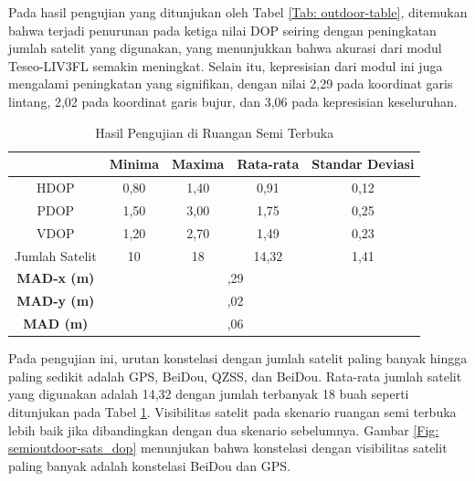 Pada hasil pengujian yang ditunjukan oleh Tabel \ref{Tab: outdoor-table}, ditemukan bahwa terjadi penurunan pada ketiga nilai DOP seiring dengan peningkatan jumlah satelit yang digunakan, yang menunjukkan bahwa akurasi dari modul Teseo-LIV3FL semakin meningkat. Selain itu, kepresisian dari modul ini juga mengalami peningkatan yang signifikan, dengan nilai 2,29 pada koordinat garis lintang, 2,02 pada koordinat garis bujur, dan 3,06 pada kepresisian keseluruhan.

\begin{table}[H]
	\caption{Hasil Pengujian di Ruangan Semi Terbuka}
	\vspace{0.5em}
	\centering
	\begin{tabular}{ccccc}
		\hline
		& \textbf{Minima} & \textbf{Maxima} & \textbf{Rata-rata} & \textbf{Standar Deviasi}\\
		\hline 
		HDOP & 0,80 & 1,40 & 0,91 & 0,12\\
		PDOP & 1,50	& 3,00 & 1,75 & 0,25\\
		VDOP & 1,20	& 2,70 & 1,49 & 0,23\\
		Jumlah Satelit & 10 & 18 & 14,32 & 1,41\\
		\hline
		\textbf{MAD-x (m)} & & \multicolumn{2}{c}{\centering 2,29} & \\
		\hline
		\textbf{MAD-y (m)} & & \multicolumn{2}{c}{\centering 2,02} & \\
		\hline
		\textbf{MAD (m)} & & \multicolumn{2}{c}{\centering 3,06} & \\
		\hline
	\end{tabular}
	\label{Tab: semioutdoor-table}
\end{table}

Pada pengujian ini, urutan konstelasi dengan jumlah satelit paling banyak hingga paling sedikit adalah GPS, BeiDou, QZSS, dan BeiDou. Rata-rata jumlah satelit yang digunakan adalah 14,32 dengan jumlah terbanyak 18 buah seperti ditunjukan pada Tabel \ref{Tab: semioutdoor-table}. Visibilitas satelit pada skenario ruangan semi terbuka lebih baik jika dibandingkan dengan dua skenario sebelumnya. Gambar \ref{Fig: semioutdoor-sats_dop} menunjukan bahwa konstelasi dengan visibilitas satelit paling banyak adalah konstelasi BeiDou dan GPS.

